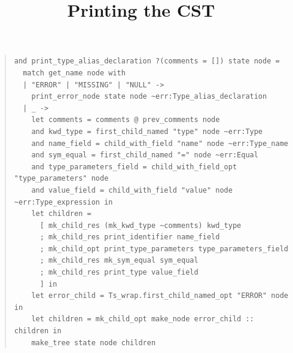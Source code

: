 \documentclass[wide]{slides}
\begin{document}
\begin{slide}
  \title{Printing the CST}

  \begin{quote}
    \lstset{basicstyle=\scriptsize}
    \begin{lstlisting}[language=caml]
and print_type_alias_declaration ?(comments = []) state node =
  match get_name node with
  | "ERROR" | "MISSING" | "NULL" ->
    print_error_node state node ~err:Type_alias_declaration
  | _ ->
    let comments = comments @ prev_comments node
    and kwd_type = first_child_named "type" node ~err:Type
    and name_field = child_with_field "name" node ~err:Type_name
    and sym_equal = first_child_named "=" node ~err:Equal
    and type_parameters_field = child_with_field_opt "type_parameters" node
    and value_field = child_with_field "value" node ~err:Type_expression in
    let children =
      [ mk_child_res (mk_kwd_type ~comments) kwd_type
      ; mk_child_res print_identifier name_field
      ; mk_child_opt print_type_parameters type_parameters_field
      ; mk_child_res mk_sym_equal sym_equal
      ; mk_child_res print_type value_field
      ] in
    let error_child = Ts_wrap.first_child_named_opt "ERROR" node in
    let children = mk_child_opt make_node error_child :: children in
    make_tree state node children
    \end{lstlisting}
  \end{quote}

\end{slide}
\end{document}
